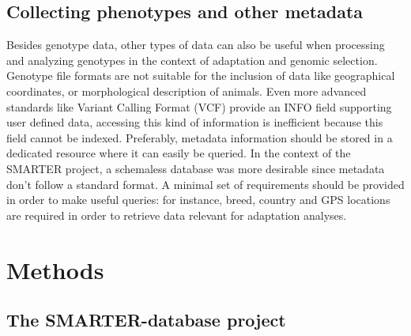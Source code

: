\documentclass[a4paper,num-refs,gigabyte]{oup-contemporary}
\begin{document}
\subsection{Collecting phenotypes and other metadata}

Besides genotype data, other types of data can also be useful when processing and analyzing genotypes in the context of adaptation and genomic selection. Genotype file formats are not suitable for the inclusion of data like geographical coordinates, or morphological description of animals. Even more advanced standards like Variant Calling Format (VCF) provide an INFO field supporting user defined data\citep{Danecek2011}, accessing this kind of information is inefficient  because this field cannot be  indexed.  Preferably, metadata information should be stored in a dedicated resource where it can easily be queried. In the context of the SMARTER project, a schemaless database was more desirable since metadata don't follow a standard format. A minimal set of requirements should be provided in order to make useful queries: for instance, breed, country and GPS locations are required in order to retrieve data relevant for adaptation analyses.

\section{Methods}

\subsection{The SMARTER-database project}
\end{document}
